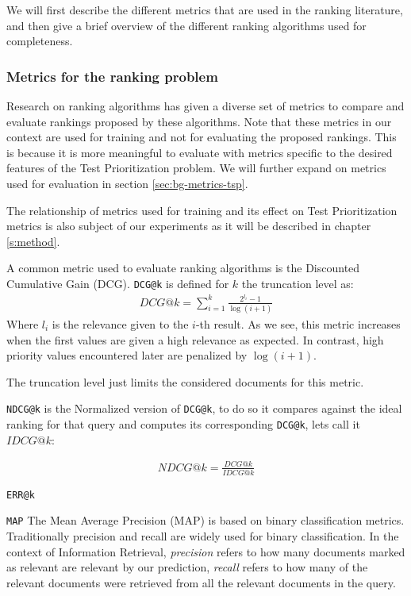 We will first describe the different metrics that are used in the ranking literature, and then
give a brief overview of the different ranking algorithms used for completeness.

\subsubsection{Metrics for the ranking problem}\label{s:bg-rnk-metrics}
Research on ranking algorithms has given a diverse set of metrics to compare and evaluate
rankings proposed by these algorithms. Note that these metrics in our context are used for
training and not for evaluating the proposed rankings. This is because it is more meaningful
to evaluate with metrics specific to the desired features of the Test Prioritization problem.
We will further expand on metrics used for evaluation in section \ref{sec:bg-metrics-tsp}.

The relationship of metrics used for training and its effect on Test Prioritization metrics is
also subject of our experiments as it will be described in chapter \ref{s:method}. 

A common metric used to evaluate ranking algorithms is the Discounted Cumulative Gain (DCG).
\texttt{DCG@k} is defined for $k$ the truncation level as:
\begin{align*}
DCG@k = \sum_{i=1}^{k}\frac{2^{l_i}-1}{\log(i+1)}
\end{align*}
Where $l_i$ is the relevance given to the $i$-th result. As we see, this metric increases
when the first values are given a high relevance as expected. In contrast, high priority
values encountered later are penalized by $\log(i+1)$.

The truncation level just limits the considered documents for this metric.

\texttt{NDCG@k} is the Normalized version of \texttt{DCG@k}, to do so it compares against
the ideal ranking for that query and computes its corresponding \texttt{DCG@k}, lets
call it $IDCG@k$:

\begin{align*}
NDCG@k = \frac{DCG@k}{IDCG@k}
\end{align*}

\texttt{ERR@k} 

\texttt{MAP}
The Mean Average Precision (MAP) is based on binary classification metrics. Traditionally
precision and recall are widely used for binary classification. In the context of
Information Retrieval, \emph{precision} refers to how many documents marked as relevant
are relevant by our prediction, \emph{recall} refers to how many of the relevant documents
were retrieved from all the relevant documents in the query. 

